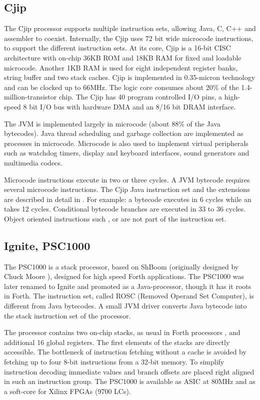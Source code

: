 \subsection{Cjip}

The Cjip processor \cite{Imsys, Cjip} supports multiple instruction
sets, allowing Java, C, C++ and assembler to coexist. Internally,
the Cjip uses 72 bit wide microcode instructions, to support the
different instruction sets. At its core, Cjip is a 16-bit CISC
architecture with on-chip 36KB ROM and 18KB RAM for fixed and
loadable microcode. Another 1KB RAM is used for eight independent
register banks, string buffer and two stack caches. Cjip is
implemented in 0.35-micron technology and can be clocked up to
66MHz. The logic core consumes about 20\% of the
1.4-million-transistor chip. The Cjip has 40 program controlled I/O
pins, a high-speed 8 bit I/O bus with hardware DMA and an 8/16 bit
DRAM interface.


The JVM is implemented largely in microcode (about 88\% of the Java
bytecodes). Java thread scheduling and garbage collection are
implemented as processes in microcode. Microcode is also used to
implement virtual peripherals such as watchdog timers, display and
keyboard interfaces, sound generators and multimedia codecs.

Microcode instructions execute in two or three cycles. A JVM
bytecode requires several microcode instructions. The Cjip Java
instruction set and the extensions are described in detail in
\cite{CjipRef}. For example: a bytecode  executes in 6
cycles while an  takes 12 cycles. Conditional bytecode
branches are executed in 33 to 36 cycles. Object oriented
instructions such ,  or
 are not part of the instruction set.


\subsection{Ignite, PSC1000}

The PSC1000 \cite{IGNITE} is a stack processor, based on ShBoom
(originally designed by Chuck Moore \cite{ShBoom}), designed for
high speed Forth applications. The PSC1000 was later renamed to
Ignite and promoted as a Java-processor, though it has it roots in
Forth. The instruction set, called ROSC (Removed Operand Set
Computer), is different from Java bytecodes. A small JVM driver
converts Java bytecode into the stack instruction set of the
processor.


The processor contains two on-chip stacks, as usual in Forth
processors \cite{Koopman89}, and additional 16 global registers. The
first elements of the stacks are directly accessible. The bottleneck
of instruction fetching without a cache is avoided by fetching up to
four 8-bit instructions from a 32-bit memory. To simplify
instruction decoding immediate values and branch offsets are placed
right aligned in such an instruction group. The PSC1000 is available
as ASIC at 80MHz and as a soft-core for Xilinx FPGAs (9700 LCs).


